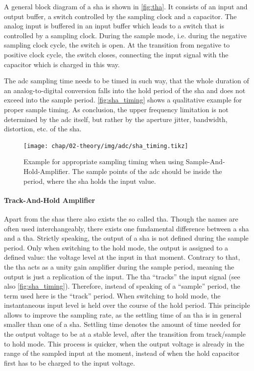 A general block diagram of a \gls{sha} is shown in \autoref{fig:tha}. %
It consists of an input and output buffer, a switch controlled by the sampling clock and a capacitor.
The analog input is buffered in an input buffer which leads to a switch that is controlled by a sampling clock.
During the sample mode, i.e. during the negative sampling clock cycle, the switch is open.
At the transition from negative to positive clock cycle, the switch closes, connecting the input signal with the capacitor which is charged in this way.

The \gls{adc} sampling time needs to be timed in such way, that the whole duration of an analog-to-digital conversion falls into the hold period of the \gls{sha} and does not exceed into the sample period. 
\autoref{fig:sha_timing} shows a qualitative example for proper sample timing. 
As conclusion, the upper frequency limitation is not determined by the \gls{adc} itself, but rather by the aperture jitter, bandwidth, distortion, etc. of the \gls{sha}. \cite{walt}

\begin{figure} [H]
	\centering
	\tikzexternaldisable
	\texttt{[image: chap/02-theory/img/adc/sha\_timing.tikz]}  
	\tikzexternalenable
	\caption[SHA timing example]{Example for appropriate sampling timing when using Sample-And-Hold-Amplifier. The sample points of the \gls{adc} should be inside the period, where the \gls{sha} holds the input value.}
	\label{fig:sha_timing}
\end{figure}
\paragraph{Track-And-Hold Amplifier}
Apart from the \glspl{sha} there also exists the so called \gls{tha}.
Though the names are often used interchangeably, there exists one fundamental difference between a \gls{sha} and a \gls{tha}.
Strictly speaking, the output of a \gls{sha} is not defined during the sample period. 
Only when switching to the hold mode, the output is assigned to a defined value: the voltage level at the input in that moment.
Contrary to that, the \gls{tha} acts as a unity gain amplifier during the sample period, meaning the output is just a replication of the input. 
The \gls{tha} ``tracks'' the input signal (see also \autoref{fig:sha_timing}).
Therefore, instead of speaking of a ``sample'' period, the term used here is the ``track'' period.
When switching to hold mode, the instantaneous input level is held over the course of the hold period.
This principle allows to improve the sampling rate, as the settling time of an \gls{tha} is in general smaller than one of a \gls{sha}.
Settling time denotes the amount of time needed for the output voltage to be at a stable level, after the transition from track/sample to hold mode.
This process is quicker, when the output voltage is already in the range of the sampled input at the moment, instead of when the hold capacitor first has to be charged to the input voltage. \cite{Reeder2017}


